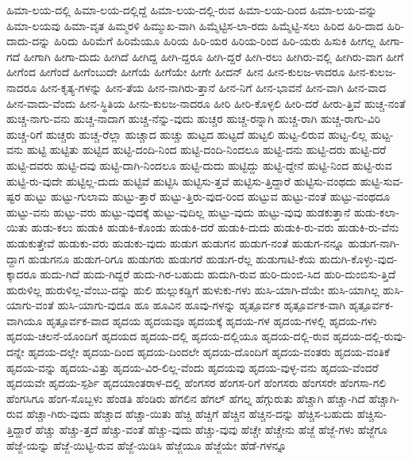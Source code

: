 {ಹಿಮಾ-ಲಯ-ದಲ್ಲಿ
ಹಿಮಾ-ಲಯ-ದಲ್ಲಿದ್ದೆ
ಹಿಮಾ-ಲಯ-ದಲ್ಲಿ-ರುವ
ಹಿಮಾ-ಲಯ-ದಿಂದ
ಹಿಮಾ-ಲಯ-ವನ್ನು
ಹಿಮಾ-ಲಯವು
ಹಿಮಾ-ವೃತ
ಹಿಮ್ಮರಳಿ
ಹಿಮ್ಮುಖ-ವಾಗಿ
ಹಿಮ್ಮೆಟ್ಟಿಸ-ಲಾ-ರದು
ಹಿಮ್ಮೆಟ್ಟಿ-ಸಲು
ಹಿರಿದ
ಹಿರಿ-ದಾದ
ಹಿರಿ-ದಾದು-ದನ್ನು
ಹಿರಿದು
ಹಿರಿಮೆಗೆ
ಹಿರಿಮೆಯೂ
ಹಿರಿಯ
ಹಿರಿ-ಯರ
ಹಿರಿಯ-ರಿಂದ
ಹಿರಿ-ಯರು
ಹಿಸುಕಿ
ಹೀಗಲ್ಲ
ಹೀಗಾ-ಗದೆ
ಹೀಗಾಗಿ
ಹೀಗಾ-ದುದು
ಹೀಗಿದೆ
ಹೀಗಿದ್ದ
ಹೀಗಿ-ದ್ದರೂ
ಹೀಗಿ-ದ್ದರೆ
ಹೀಗಿ-ರಲು
ಹೀಗಿರು-ವಲ್ಲಿ
ಹೀಗಿರು-ವಾಗ
ಹೀಗೆ
ಹೀಗೆಂದ
ಹೀಗೆಂದೆ
ಹೀಗೆಂಬುದೇ
ಹೀಗೆಯೆ
ಹೀಗೆಯೇ
ಹೀಗೇ
ಹೀದನ್
ಹೀನ
ಹೀನ-ಕುಲಜ-ಳಾದರೂ
ಹೀನ-ಕುಲಜ-ನಾದರೂ
ಹೀನ-ಕೃತ್ಯ-ಗಳನ್ನು
ಹೀನ-ತೆಯ
ಹೀನ-ನಾಗಿರು-ತ್ತಾನೆ
ಹೀನ-ನಿಗೆ
ಹೀನ-ಭಾವನೆ
ಹೀನ-ವಾಗಿ
ಹೀನ-ವಾದ
ಹೀನ-ವಾದು-ವೆಂದು
ಹೀನ-ಸ್ಥಿತಿಯ
ಹೀನು-ಕುಲಜ-ನಾದರೂ
ಹೀರಿ
ಹೀರಿ-ಕೊಳ್ಳಲಿ
ಹೀರಿ-ದರೆ
ಹೀರು-ತ್ತಿವೆ
ಹುಚ್ಚ-ನಂತೆ
ಹುಚ್ಚ-ನಾಗು-ವನು
ಹುಚ್ಚ-ನಾದಾಗ
ಹುಚ್ಚ-ನೆನ್ನು-ವುದು
ಹುಚ್ಚರ
ಹುಚ್ಚ-ರನ್ನಾಗಿ
ಹುಚ್ಚ-ರಾಗಿ
ಹುಚ್ಚ-ರಾಗು-ವಿರಿ
ಹುಚ್ಚ-ರಿಗೆ
ಹುಚ್ಚರು
ಹುಚ್ಚ-ರೆಲ್ಲಾ
ಹುಚ್ಚಾದ
ಹುಚ್ಚು
ಹುಟ್ಟದ
ಹುಟ್ಟದೆ
ಹುಟ್ಟಲಿ
ಹುಟ್ಟ-ಲಿರುವ
ಹುಟ್ಟ-ಲಿಲ್ಲ
ಹುಟ್ಟ-ವನು
ಹುಟ್ಟಿ
ಹುಟ್ಟಿತು
ಹುಟ್ಟಿದ
ಹುಟ್ಟಿ-ದಂದಿ-ನಿಂದ
ಹುಟ್ಟಿ-ದಂದಿ-ನಿಂದಲೂ
ಹುಟ್ಟಿ-ದನು
ಹುಟ್ಟಿ-ದರು
ಹುಟ್ಟಿ-ದರೆ
ಹುಟ್ಟಿ-ದವರು
ಹುಟ್ಟಿ-ದವು
ಹುಟ್ಟಿ-ದಾಗಿ-ನಿಂದಲೂ
ಹುಟ್ಟಿ-ದುದು
ಹುಟ್ಟಿದ್ದು
ಹುಟ್ಟಿ-ದ್ದೇನೆ
ಹುಟ್ಟಿ-ನಿಂದ
ಹುಟ್ಟಿ-ರುವ
ಹುಟ್ಟಿ-ರು-ವುದೇ
ಹುಟ್ಟಿಲ್ಲ-ದುದು
ಹುಟ್ಟಿವೆ
ಹುಟ್ಟಿಸಿ
ಹುಟ್ಟಿಸು-ತ್ತವೆ
ಹುಟ್ಟಿಸು-ತ್ತಿದ್ದಾರೆ
ಹುಟ್ಟಿಸು-ವಂಥದು
ಹುಟ್ಟಿ-ಸುವ-ಷ್ಟರ
ಹುಟ್ಟು
ಹುಟ್ಟು-ಗುಲಾಮ
ಹುಟ್ಟು-ತ್ತಾರೆ
ಹುಟ್ಟು-ತ್ತಿರು-ವುದ-ರಿಂದ
ಹುಟ್ಟುವ
ಹುಟ್ಟು-ವಂತೆ
ಹುಟ್ಟು-ವಂಥದೂ
ಹುಟ್ಟು-ವನು
ಹುಟ್ಟು-ವರು
ಹುಟ್ಟು-ವುದಕ್ಕೆ
ಹುಟ್ಟು-ವುದಿಲ್ಲ
ಹುಟ್ಟು-ವುದು
ಹುಟ್ಟು-ವುವು
ಹುಡಕುತ್ತಾನೆ
ಹುಡು-ಕಲಾ-ಯಿತು
ಹುಡು-ಕಲು
ಹುಡುಕಿ
ಹುಡುಕಿ-ಕೊಂಡು
ಹುಡುಕಿ-ದರೆ
ಹುಡುಕಿ-ದುದು
ಹುಡುಕಿ-ರು-ವರು
ಹುಡುಕಿ-ರು-ವೆನು
ಹುಡುಕುತ್ತೇವೆ
ಹುಡುಕು-ವರು
ಹುಡುಕು-ವುದು
ಹುಡುಗ
ಹುಡುಗನ
ಹುಡುಗ-ನಂತೆ
ಹುಡುಗ-ನನ್ನೂ
ಹುಡುಗ-ನಾಗಿ-ದ್ದಾಗ
ಹುಡುಗನೂ
ಹುಡುಗ-ರಿಗೂ
ಹುಡುಗರು
ಹುಡುಗರೆ
ಹುಡುಗ-ರೆಲ್ಲ
ಹುಡುಗಾಟಿ-ಕೆಯ
ಹುದುಗಿ-ಕೊಳ್ಳು-ವುದ-ಕ್ಕಾದರೂ
ಹುದು-ಗಿದೆ
ಹುದು-ಗಿದ್ದರೆ
ಹುದು-ಗಿರ-ಬಹುದು
ಹುದುಗಿ-ರುವ
ಹುರಿ-ದುಂಬಿ-ಸಿದ
ಹುರಿ-ದುಂಬಿಸು-ತ್ತಿದೆ
ಹುರುಳಿಲ್ಲ
ಹುರುಳಿಲ್ಲ-ವೆಂಬು-ದನ್ನು
ಹುಲಿ
ಹುಲ್ಲುಕಡ್ಡಿಗೆ
ಹುಳುಕು-ಗಳು
ಹುಸಿ-ಯಾಗಿ-ದೆಯೇ
ಹುಸಿ-ಯಾಗಿಲ್ಲ
ಹುಸಿ-ಯಾಗು-ವಂತೆ
ಹುಸಿ-ಯಾಗು-ವುದೂ
ಹೂ
ಹೂವಿನ
ಹೂವು-ಗಳನ್ನು
ಹೃತ್ಪೂರ್ವಕ
ಹೃತ್ಪೂರ್ವಕ-ವಾಗಿ
ಹೃತ್ಪೂರ್ವಕ-ವಾಗಿಯೂ
ಹೃತ್ಪೂರ್ವಕ-ವಾದ
ಹೃದಯ
ಹೃದಯವೂ
ಹೃದಯಕ್ಕೆ
ಹೃದಯ-ಗಳ
ಹೃದಯ-ಗಳಲ್ಲಿ
ಹೃದಯ-ಗಳು
ಹೃದಯ-ಚಲನೆ-ಯೊಂದಿಗೆ
ಹೃದಯದ
ಹೃದಯ-ದಲ್ಲಿ
ಹೃದಯ-ದಲ್ಲಿಯೂ
ಹೃದಯ-ದಲ್ಲಿ-ರುವ
ಹೃದಯ-ದಲ್ಲಿ-ರುವು-ದನ್ನೇ
ಹೃದಯ-ದಲ್ಲೇ
ಹೃದಯ-ದಿಂದ
ಹೃದಯ-ದಿಂದಲೇ
ಹೃದಯ-ದೊಂದಿಗೆ
ಹೃದಯ-ವಂತರು
ಹೃದಯ-ವಂತಿಕೆ
ಹೃದಯ-ವನ್ನು
ಹೃದಯ-ವಿತ್ತು
ಹೃದಯ-ವಿರ-ಲಿಲ್ಲ-ವೆಂದು
ಹೃದಯವು
ಹೃದಯ-ವುಳ್ಳ-ವನು
ಹೃದಯ-ವೆಂದರೆ
ಹೃದಯವೇ
ಹೃದಯ-ಸ್ಪರ್ಶಿ
ಹೃದಯಾಂತರಾಳ-ದಲ್ಲಿ
ಹೆಂಗಸರ
ಹೆಂಗಸ-ರಿಗೆ
ಹೆಂಗಸರು
ಹೆಂಗಸರೇ
ಹೆಂಗಸಾ-ಗಲಿ
ಹೆಂಗಸಿಗೂ
ಹೆಂಗ-ಸೊಬ್ಬಳು
ಹೆಂಡತಿ
ಹೆಂಡಿರು
ಹೆಗಲಿನ
ಹೆಗಲ್
ಹೆಗಲ್ನ
ಹೆಗ್ಗುರುತು
ಹೆಚ್ಚಾಗಿ
ಹೆಚ್ಚಾ-ಗಿದೆ
ಹೆಚ್ಚಾಗಿ-ರುವ
ಹೆಚ್ಚಾ-ಗಿರು-ವುದು
ಹೆಚ್ಚಾದ
ಹೆಚ್ಚಾ-ಯಿತು
ಹೆಚ್ಚಿ
ಹೆಚ್ಚಿಗೆ
ಹೆಚ್ಚಿನ
ಹೆಚ್ಚಿನ-ದನ್ನು
ಹೆಚ್ಚಿಸ-ಬಹುದು
ಹೆಚ್ಚಿಸು-ತ್ತಿದ್ದಾರೆ
ಹೆಚ್ಚು
ಹೆಚ್ಚು-ತ್ತದೆ
ಹೆಚ್ಚು-ವಂತೆ
ಹೆಚ್ಚು-ವುದು
ಹೆಚ್ಚು-ವುವು
ಹೆಚ್ಚೇ
ಹೆಚ್ಚೇನು
ಹೆಜ್ಜೆ
ಹೆಜ್ಜೆ-ಗಳು
ಹೆಜ್ಜೆಗೂ
ಹೆಜ್ಜೆ-ಯನ್ನು
ಹೆಜ್ಜೆ-ಯಿಟ್ಟಿ-ರುವ
ಹೆಜ್ಜೆ-ಯಿಡಿಸಿ
ಹೆಜ್ಜೆಯೂ
ಹೆಜ್ಜೆಯೇ
ಹೆಡೆ-ಗಳನ್ನೂ
}
